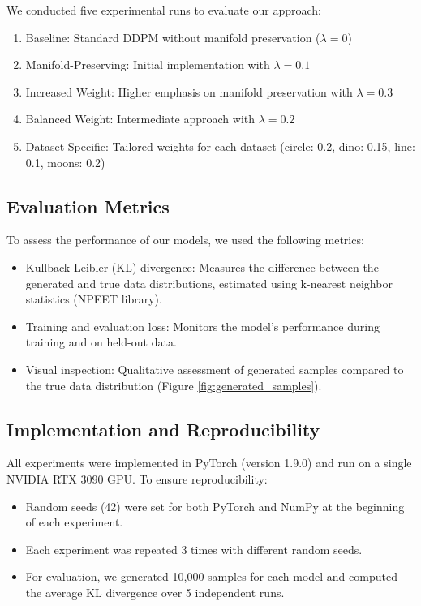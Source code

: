 \documentclass{article} %
\begin{document}
We conducted five experimental runs to evaluate our approach:

\begin{enumerate}
    \item Baseline: Standard DDPM without manifold preservation ($\lambda = 0$)
    \item Manifold-Preserving: Initial implementation with $\lambda = 0.1$
    \item Increased Weight: Higher emphasis on manifold preservation with $\lambda = 0.3$
    \item Balanced Weight: Intermediate approach with $\lambda = 0.2$
    \item Dataset-Specific: Tailored weights for each dataset (circle: 0.2, dino: 0.15, line: 0.1, moons: 0.2)
\end{enumerate}

\subsection{Evaluation Metrics}

To assess the performance of our models, we used the following metrics:

\begin{itemize}
    \item Kullback-Leibler (KL) divergence: Measures the difference between the generated and true data distributions, estimated using k-nearest neighbor statistics (NPEET library).
    \item Training and evaluation loss: Monitors the model's performance during training and on held-out data.
    \item Visual inspection: Qualitative assessment of generated samples compared to the true data distribution (Figure \ref{fig:generated_samples}).
\end{itemize}

\subsection{Implementation and Reproducibility}

All experiments were implemented in PyTorch (version 1.9.0) and run on a single NVIDIA RTX 3090 GPU. To ensure reproducibility:

\begin{itemize}
    \item Random seeds (42) were set for both PyTorch and NumPy at the beginning of each experiment.
    \item Each experiment was repeated 3 times with different random seeds.
    \item For evaluation, we generated 10,000 samples for each model and computed the average KL divergence over 5 independent runs.
\end{itemize}
\end{document}
